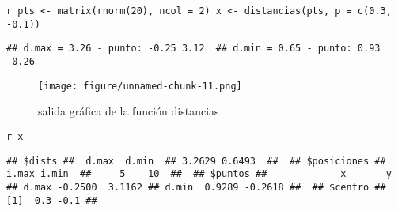 \documentclass{article}
\makeatletter
\def\maxwidth{\ifdim\Gin@nat@width>\linewidth\linewidth
\else\Gin@nat@width\fi}
\let\Oldincludegraphics\includegraphics
\renewcommand{\includegraphics}[1]{\Oldincludegraphics[width=\maxwidth]{#1}}
\makeatother
\begin{document}
\verb!r pts <- matrix(rnorm(20), ncol = 2) x <- distancias(pts, p = c(0.3, -0.1))!

\verb!## d.max = 3.26 - punto: -0.25 3.12  ## d.min = 0.65 - punto: 0.93 -0.26!

\begin{figure}[htbp]
\centering
\texttt{[image: figure/unnamed-chunk-11.png]}
\caption{salida gráfica de la función distancias}
\end{figure}

\verb!r x!

\verb!## $dists ##  d.max  d.min  ## 3.2629 0.6493  ##  ## $posiciones ## i.max i.min  ##     5    10  ##  ## $puntos ##             x       y ## d.max -0.2500  3.1162 ## d.min  0.9289 -0.2618 ##  ## $centro ## [1]  0.3 -0.1 ##!
\end{document}
